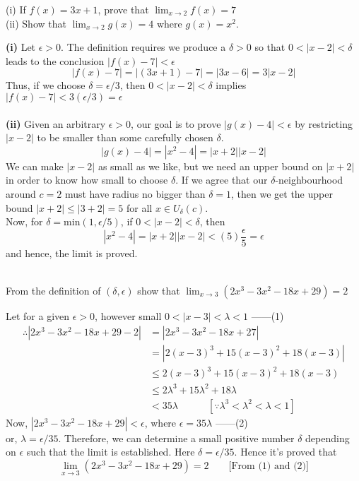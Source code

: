 \begin{example}{(i) If $f(x) = 3x+1$, prove that $ \lim_{x \to 2} f(x) = 7 $ \\
    (ii) Show that $\lim_{x \to 2} g(x) = 4$ where $g(x)=x^2$.}

    \textbf{(i)} Let $\epsilon>0$. The definition requires we produce a $\delta>0$ so that $0<|x-2|<\delta$ leads to the conclusion $|f(x)-7|<\epsilon$ \[
        |f(x)-7| = |(3x+1)-7| = |3x-6| = 3|x-2|
    \]
    Thus, if we choose $\delta=\epsilon/3$, then $0<|x-2|<\delta$ implies $|f(x)-7|<3(\epsilon/3)=\epsilon$ \\~\\
    
    \textbf{(ii)} Given an arbitrary $\epsilon>0$, our goal is to prove $|g(x)-4|<\epsilon$ by restricting $| x-2 |$ to be smaller than some carefully chosen $\delta$. \[
        |g(x)-4| = |x^2-4| = |x+2||x-2|
    \] We can make $|x-2|$ as small as we like, but we need an upper bound on $|x+2|$ in order to know how small to choose $\delta$. If we agree that our $\delta$-neighbourhood around $c=2$ must have radius no bigger than $\delta=1$, then we get the upper bound $|x+2|\le |3+2|=5$ for all $x\in U_\delta(c)$. \\
    Now, for $\delta=\text{min}(1,\epsilon/5)$, if $0<|x-2|<\delta$, then \[
        |x^2-4| = |x+2||x-2| < (5)\frac{\epsilon}{5} = \epsilon
    \] and hence, the limit is proved. \\~\\
\end{example}

\begin{example}{From the definition of $(\delta,\epsilon)$ show that $\lim_{x \to 3} (2x^3-3x^2-18x+29)=2$}

    Let for a given $\epsilon>0$, however small $0<|x-3|<\lambda<1$ ------(1)
    \begin{align*}
        \therefore |2x^3-3x^2-18x+29 - 2| &= |2x^3-3x^2-18x+27| \\
        &= |2(x-3)^3 + 15(x-3)^2 + 18(x-3)| \\
        &\le 2(x-3)^3 + 15(x-3)^2 + 18(x-3) \\
        &\le 2\lambda^3 + 15\lambda^2 + 18\lambda \\
        &< 35\lambda \quad\quad\quad [ \because \lambda^3<\lambda^2<\lambda<1 ]
    \end{align*}
    Now, $|2x^3-3x^2-18x+29|<\epsilon$, where $\epsilon=35\lambda$ ------(2) \\
    or, $\lambda=\epsilon/35$. Therefore, we can determine a small positive number $\delta$ depending on $\epsilon$ such that the limit is established. Here $\delta=\epsilon/35$. Hence it's proved that \[
        \lim_{x \to 3} (2x^3-3x^2-18x+29) = 2 \quad\quad \text{[From (1) and (2)]}
    \]
\end{example}


